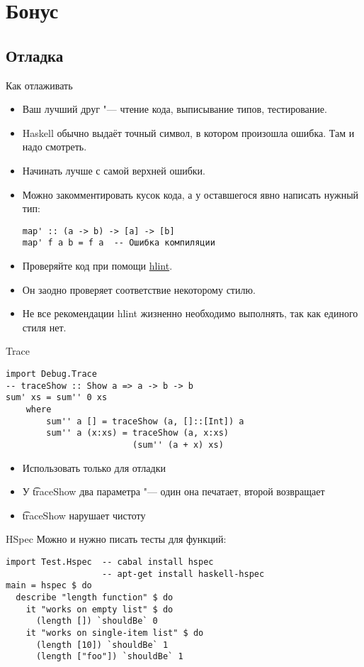 \section{Бонус}
\subsection{Отладка}

\begin{frame}
\end{frame}

\begin{frame}[fragile]{Как отлаживать}
	\begin{itemize}
		\item Ваш лучший друг "--- чтение кода, выписывание типов, тестирование.
		\item Haskell обычно выдаёт точный символ, в котором произошла ошибка. Там и надо смотреть.
		\item Начинать лучше с самой верхней ошибки.
		\item Можно закомментировать кусок кода, а у оставшегося явно написать нужный тип:
\begin{verbatim}
map' :: (a -> b) -> [a] -> [b]
map' f a b = f a  -- Ошибка компиляции
\end{verbatim}
		\item Проверяйте код при помощи \href{https://hackage.haskell.org/package/hlint}{hlint}.
		\item Он заодно проверяет соответствие некоторому стилю.
		\item Не все рекомендации hlint жизненно необходимо выполнять, так как единого стиля нет.
	\end{itemize}
\end{frame}

\begin{frame}[fragile]{Trace}
\begin{verbatim}
import Debug.Trace
-- traceShow :: Show a => a -> b -> b
sum' xs = sum'' 0 xs
    where
        sum'' a [] = traceShow (a, []::[Int]) a
        sum'' a (x:xs) = traceShow (a, x:xs)
                         (sum'' (a + x) xs)
\end{verbatim}
	\begin{itemize}
		\item Использовать только для отладки
		\item У \t{traceShow} два параметра "--- один она печатает, второй возвращает
		\item \t{traceShow} нарушает чистоту
	\end{itemize}
\end{frame}

\begin{frame}[fragile]{HSpec}
	Можно и нужно писать тесты для функций:
\begin{verbatim}
import Test.Hspec  -- cabal install hspec
                   -- apt-get install haskell-hspec
main = hspec $ do
  describe "length function" $ do
    it "works on empty list" $ do
      (length []) `shouldBe` 0
    it "works on single-item list" $ do
      (length [10]) `shouldBe` 1
      (length ["foo"]) `shouldBe` 1
\end{verbatim}
\end{frame}
